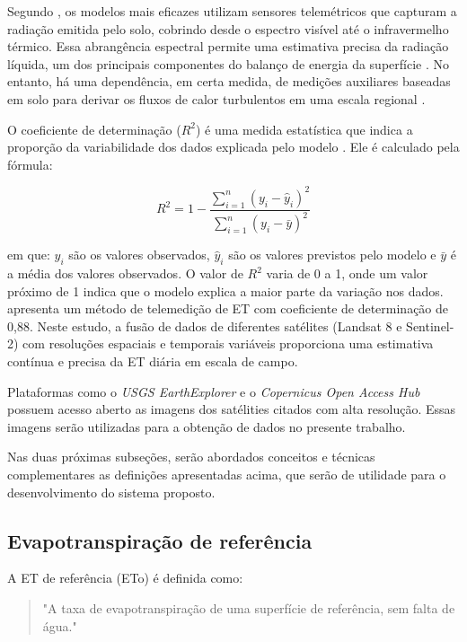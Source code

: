 Segundo \textcite{Zhao_evapotranspiration_med2009}, os modelos mais eficazes utilizam sensores telemétricos que capturam a radiação emitida pelo solo, cobrindo desde o espectro visível até o infravermelho térmico. Essa abrangência espectral permite uma estimativa precisa da radiação líquida, um dos principais componentes do balanço de energia da superfície \parencite{Zhao_evapotranspiration_med2009}. No entanto, há uma dependência, em certa medida, de medições auxiliares baseadas em solo para derivar os fluxos de calor turbulentos em uma escala regional \parencite{Zhang_evapotranspiration_med2016}.

O coeficiente de determinação (\(R^2\)) é uma medida estatística que indica a proporção da variabilidade dos dados explicada pelo modelo \parencite{mood1974}. Ele é calculado pela fórmula:

\[
R^2 = 1 - \frac{\sum_{i=1}^n (y_i - \hat{y}_i)^2}{\sum_{i=1}^n (y_i - \bar{y})^2}
\]

\noindent em que: \(y_i\) são os valores observados, \(\hat{y}_i\) são os valores previstos pelo modelo e \(\bar{y}\) é a média dos valores observados. O valor de \(R^2\) varia de 0 a 1, onde um valor próximo de 1 indica que o modelo explica a maior parte da variação nos dados. \textcite{Yang_evapotranspiration_med2022} apresenta um método de telemedição de ET com coeficiente de determinação de 0,88. Neste estudo, a fusão de dados de diferentes satélites (Landsat 8 e Sentinel-2) com resoluções espaciais e temporais variáveis proporciona uma estimativa contínua e precisa da ET diária em escala de campo.


Plataformas como o \textit{USGS EarthExplorer} e o \textit{Copernicus Open Access Hub} possuem acesso aberto as imagens dos satélities citados com alta resolução. Essas imagens serão utilizadas para a obtenção de dados no presente trabalho.

Nas duas próximas subseções, serão abordados conceitos e técnicas complementares as definições apresentadas acima, que serão de utilidade para o desenvolvimento do sistema proposto.

\subsection{Evapotranspiração de referência}

A ET de referência (ETo) é definida como:

\begin{quote}
  "A taxa de evapotranspiração de uma superfície de referência, sem falta de água." \parencite[{p. 7}]{Allen_evapotranspiration1998}
\end{quote}

